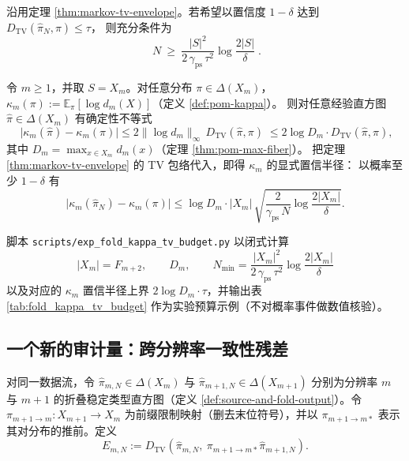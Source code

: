 \begin{corollary}\label{cor:markov-tv-sample-complexity}
沿用定理 \ref{thm:markov-tv-envelope}。若希望以置信度 \(1-\delta\) 达到
\(
D_{\mathrm{TV}}(\hat{\pi}_N,\pi)\le \tau
\)，
则充分条件为
\[
\boxed{\;
N\ \ge\ \frac{|S|^{2}}{2\,\gamma_{\mathrm{ps}}\,\tau^{2}}
\log\frac{2|S|}{\delta}\; }.
\]
\end{corollary}

\begin{corollary}\label{cor:kappa-confidence-from-tv}
令 \(m\ge 1\)，并取 \(S=X_m\)。对任意分布 \(\pi\in\Delta(X_m)\)，\(\kappa_m(\pi):=\mathbb{E}_{\pi}[\log d_m(X)]\)（定义 \ref{def:pom-kappa}）。
则对任意经验直方图 \(\hat{\pi}\in\Delta(X_m)\) 有确定性不等式
\[
\boxed{\;
\bigl|\kappa_m(\hat{\pi})-\kappa_m(\pi)\bigr|
\le 2\|\log d_m\|_{\infty}\,D_{\mathrm{TV}}(\hat{\pi},\pi)\;}
\le 2\log D_m\cdot D_{\mathrm{TV}}(\hat{\pi},\pi),
\]
其中 \(D_m=\max_{x\in X_m}d_m(x)\)（定理 \ref{thm:pom-max-fiber}）。
把定理 \ref{thm:markov-tv-envelope} 的 TV 包络代入，即得 \(\kappa_m\) 的显式置信半径：
以概率至少 \(1-\delta\) 有
\[
\bigl|\kappa_m(\hat{\pi}_N)-\kappa_m(\pi)\bigr|
\le \log D_m\cdot |X_m|\,
\sqrt{\frac{2}{\gamma_{\mathrm{ps}}\,N}\log\frac{2|X_m|}{\delta}}.
\]
\end{corollary}

\begin{remark}\label{rem:fold-kappa-tv-budget-repro}
脚本 \texttt{scripts/exp\_fold\_kappa\_tv\_budget.py} 以闭式计算
\[
|X_m|=F_{m+2},\qquad D_m,\qquad
N_{\min}=\frac{|X_m|^{2}}{2\,\gamma_{\mathrm{ps}}\,\tau^{2}}\log\frac{2|X_m|}{\delta}
\]
以及对应的 \(\kappa_m\) 置信半径上界 \(2\log D_m\cdot\tau\)，并输出表 \ref{tab:fold_kappa_tv_budget} 作为实验预算示例（不对概率事件做数值核验）。

\end{remark}

\subsection{一个新的审计量：跨分辨率一致性残差}\label{subsec:multiscale-residual}

\begin{definition}[跨分辨率一致性残差]\label{def:multiscale-residual}
对同一数据流，令 \(\hat{\pi}_{m,N}\in\Delta(X_m)\) 与 \(\hat{\pi}_{m+1,N}\in\Delta(X_{m+1})\) 分别为分辨率 \(m\) 与 \(m+1\) 的折叠稳定类型直方图（定义 \ref{def:source-and-fold-output}）。令 \(\pi_{m+1\to m}:X_{m+1}\to X_m\) 为前缀限制映射（删去末位符号），并以 \(\pi_{m+1\to m*}\) 表示其对分布的推前。定义
\[
E_{m,N}
:=
D_{\mathrm{TV}}\!\left(\hat{\pi}_{m,N},\ \pi_{m+1\to m*}\hat{\pi}_{m+1,N}\right).
\]
\end{definition}

